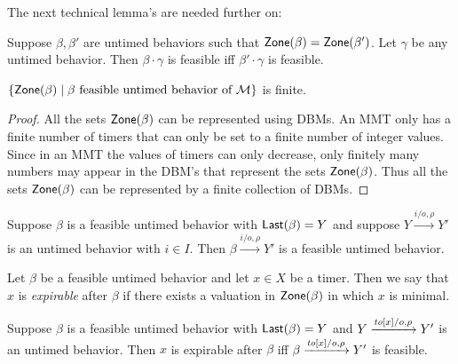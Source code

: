 The next technical lemma's are needed further on:

\begin{lemma}
\label{lemma: feasibility concatenation}
Suppose $\beta, \beta'$ are untimed behaviors such that
$\mathsf{Zone}({\beta}) = \mathsf{Zone}({\beta'})$. Let $\gamma$ be any untimed behavior.
Then $\beta \cdot \gamma$ is feasible iff $\beta' \cdot \gamma$ is feasible.
\end{lemma}

\begin{lemma}
\label{lemma finitely many zones}
$\{ \mathsf{Zone}({\beta}) \mid \beta \mbox{ feasible untimed behavior of } {\mathcal M} \}$ is finite.
\end{lemma}
\begin{proof}
All the sets $\mathsf{Zone}({\beta})$ can be represented using DBMs. An MMT only has a finite number of timers that can only be set to a finite number of integer values. Since in an MMT the values of timers can only decrease, only finitely many numbers may
appear in the DBM's that represent the sets $\mathsf{Zone}({\beta})$. Thus all the sets $\mathsf{Zone}({\beta})$ can be represented by a finite
collection of DBMs.
\end{proof}

\begin{lemma}
\label{feasible plus input is feasible}
Suppose $\beta$ is a feasible untimed behavior with $\mathsf{Last}({\beta}) = Y$ and 
suppose $Y \xrightarrow{i/o, \rho} Y'$ is an untimed behavior with $i \in I$.
Then $\beta \xrightarrow{i/o, \rho} Y'$ is a feasible untimed behavior.
\end{lemma}

Let $\beta$ be a feasible untimed behavior and let $x \in X$ be a timer. Then we say that $x$ is \emph{expirable} after $\beta$
if there exists a valuation in $\mathsf{Zone}({\beta})$ in which $x$ is minimal.

\begin{lemma}
Suppose $\beta$ is a feasible untimed behavior with $\mathsf{Last}({\beta}) = Y$ and $Y \xrightarrow{\mathit{to}[x]/o, \rho} Y'$ is an untimed behavior.
Then $x$ is expirable after $\beta$ iff $\beta \xrightarrow{\mathit{to}[x]/o, \rho} Y'$ is feasible.
\end{lemma}

